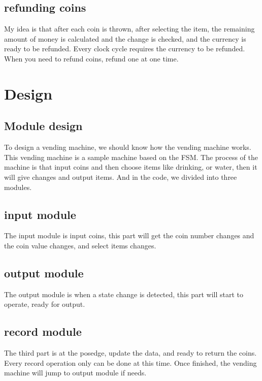 \documentclass[12pt,a4paper]{article}
\begin{document}
\subsection{refunding coins}

My idea is that after each coin is thrown, after selecting the item, the remaining amount of money is calculated and the change is checked, and the currency is ready to be refunded. 
Every clock cycle requires the currency to be refunded.
When you need to refund coins, refund one at one time.

\newpage

\section{Design}
\subsection{Module design}

To design a vending machine, we should know how the vending machine works.
This vending machine is a sample machine based on the FSM.
The process of the machine is that input coins and then choose items like drinking, or water, then it will give changes and output items.
And in the code, we divided into three modules. 

\subsection{input module}
The input module is input coins, this part will get the coin number changes and the coin value changes, and select items changes.

\subsection{output module}
The output module is when a state change is detected, this part will start to operate, ready for output.

\subsection{record module}

The third part is at the posedge, update the data, and ready to return the coins. 
Every record operation only can be done at this time.
Once finished, the vending machine will jump to output module if needs.

\end{document}
